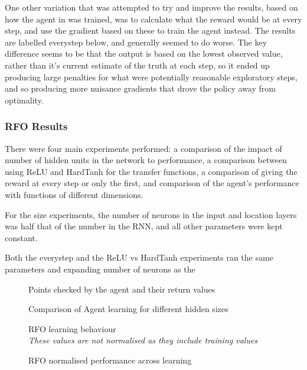 One other variation that was attempted to try and improve the results, based on how the agent in \cite{RVA} was trained, was to calculate what the reward would be at every step, and use the gradient based on these to train the agent instead. The results are labelled everystep below, and generally seemed to do worse. The key difference seems to be that the output is based on the lowest observed value, rather than it's current estimate of the truth at each step, so it ended up producing large penalties for what were potentially reasonable exploratory steps, and so producing more nuisance gradients that drove the policy away from optimality.


\subsubsection{RFO Results}
There were four main experiments performed: a comparison of the impact of number of hidden units in the network to performance, a comparison between using ReLU and HardTanh for the transfer functions, a comparison of giving the reward at every step or only the first, and comparison of the agent's performance with functions of different dimensions.

For the size experiments, the number of neurons in the input and location layers was half that of the number in the RNN, and all other parameters were kept constant. %

Both the everystep and the ReLU vs HardTanh experiments ran the same parameters and expanding number of neurons as the %




\begin{figure}
\centering
\caption{Points checked by the agent and their return values}
\end{figure}

\begin{figure}
\centering

\caption{Comparison of Agent learning for different hidden sizes}
\label{fig:exp1rfo}
\end{figure}



\begin{figure}
\centering

\caption{RFO learning behaviour \\ \emph{These values are not normalised as they include training values}}
\label{fig:opt1full}
\end{figure}
\begin{figure}
\centering

\caption{RFO normalised performance across learning}
\label{fig:opt1norm}
\end{figure}

